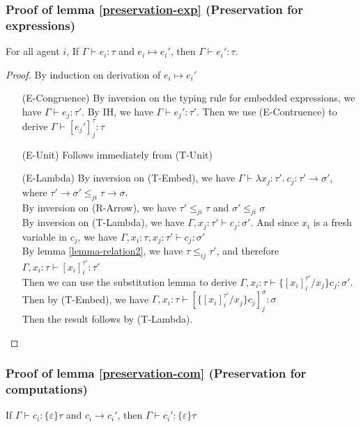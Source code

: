\subsubsection{Proof of lemma \ref{preservation-exp} (Preservation for expressions)}  
For all agent $i$, If $\Gamma \vdash e_i : \tau$ and $e_i \mapsto e_i'$, then $\Gamma \vdash e_i' : \tau$.
\begin{proof}
By induction on derivation of $e_i \mapsto e_i'$
\begin{enumerate}[align=left]
\item[(E-Congruence)] By inversion on the typing rule for embedded expressions, we have $\Gamma \vdash e_j : \tau'$. By IH, we have $\Gamma \vdash e_j' : \tau'$. Then we use (E-Contruence) to derive $\Gamma \vdash [e_j']^\tau_j : \tau$

\item[(E-Unit)] Follows immediately from  (T-Unit)
\item[(E-Lambda)] By inversion on (T-Embed), we have $\Gamma \vdash \lambda x_j:\tau'.\ c_j : \tau' \rightarrow \sigma'$, where $\tau' \rightarrow \sigma' \leq_{ji} \tau \rightarrow \sigma$.\\
By inversion on (R-Arrow), we have $\tau' \leq_{ji} \tau$ and $\sigma' \leq_{ji} \sigma$\\
By inversion on (T-Lambda), we have $\Gamma, x_j : \tau' \vdash c_j : \sigma'$. And since $x_i$ is a fresh variable in $c_j$, we have $\Gamma, x_i : \tau, x_j : \tau' \vdash c_j : \sigma'$\\
By lemma \ref{lemma-relation2}, we have $\tau \leq_{ij} \tau'$, and therefore $\Gamma, x_i : \tau \vdash [x_i]^{\tau'}_i : \tau'$\\
Then we can use the substitution lemma to derive $\Gamma, x_i : \tau \vdash \{[x_i]^{\tau'}_i / x_j\}c_j : \sigma'$.\\
Then by (T-Embed), we have $\Gamma, x_i : \tau \vdash [  \{[x_i]^{\tau'}_i / x_j\}c_j ]^\sigma_j : \sigma$\\
Then the result follows by (T-Lambda).

\end{enumerate}
\end{proof}

\subsubsection{Proof of lemma \ref{preservation-com} (Preservation for computations)}
If $\Gamma \vdash c_i : \{\varepsilon\} \tau$ and $c_i \longrightarrow c_i'$, then $\Gamma \vdash c_i' : \{\varepsilon\}\tau$

